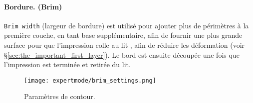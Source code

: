 \paragraph{Bordure. (Brim)} %
\label{par:expert_brim}
\texttt{Brim width} (largeur de bordure) est utilis\'e pour ajouter plus de p\'erim\`etres \`a la premi\`ere couche, en tant base suppl\'ementaire, afin de fournir une plus grande surface pour que l'impression colle au lit , afin de r\'eduire les d\'eformation (voir §\ref{sec:the_important_first_layer}). Le bord est ensuite d\'ecoup\'ee une fois que l'impression est termin\'ee et retir\'ee du lit.
\begin{figure}[H]
\centering
\texttt{[image: expertmode/brim\_settings.png]}
\caption{Param\`etres de contour.}
\label{fig:brim_settings}
\end{figure}



